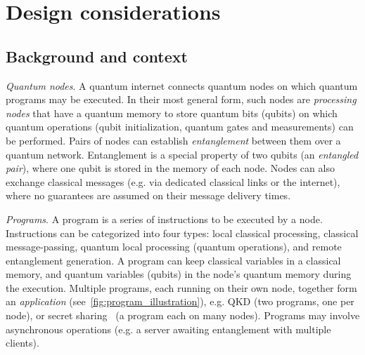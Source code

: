 \section{Design considerations}
\label{sec:design_considerations}

\subsection{Background and context}
\label{sec:background_context}


\textit{Quantum nodes}.
A quantum internet connects quantum nodes on which quantum programs may be 
executed.
In their most general form, such nodes
are \textit{processing nodes} that have a quantum memory to store quantum bits (qubits) on which quantum operations (qubit initialization, quantum gates and measurements) can be performed. Pairs of nodes can establish \textit{entanglement} between them over a quantum network. Entanglement is a special property of two qubits (an \emph{entangled pair}), where one qubit is stored in the memory of each node. Nodes can also exchange classical messages (e.g. via dedicated classical links or the internet), where no guarantees are assumed on their message delivery times. 

\textit{Programs}.
A program is a series of instructions to be executed by a node.
Instructions can be categorized into four types: local classical processing, classical message-passing, quantum local processing (quantum operations), and remote entanglement generation.
A program can keep classical variables in a classical memory, and quantum variables (qubits) in the node's quantum memory during the execution.
Multiple programs, each running on their own node, together form an \textit{application} (see~\ref{fig:program_illustration}), e.g. QKD (two programs, one per node),
or secret sharing~\cite{hillery1999quantum} (a program each on many nodes).
Programs may involve asynchronous operations (e.g. a server awaiting entanglement with multiple clients).

